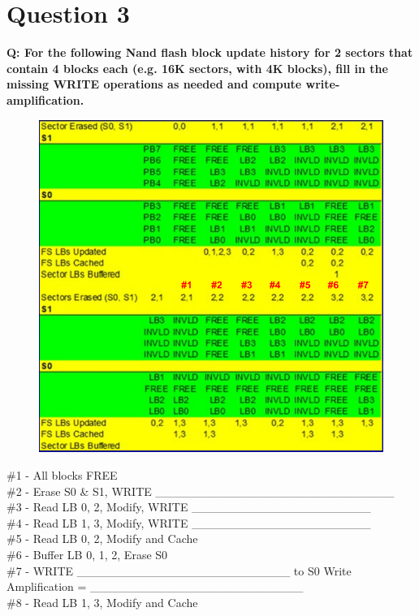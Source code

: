 \documentclass[a4paper,11pt]{article}%
\newenvironment{qanda}{\setlength{\parindent}{0pt}}{\bigskip}
\newcommand{\Q}{\bigskip\bfseries Q: }
\begin{document}
\begin{qanda}
	\section{Question 3}
	\Q  For the following Nand flash block update history for 2 sectors that contain 4 blocks each (e.g. 16K
	sectors, with 4K blocks), fill in the missing WRITE operations as needed and compute write-
	amplification.\\
	\begin{figure}[H]
		\centering
		\includegraphics[scale=0.6]{figures/q3.png}
	\end{figure}
	\#1 - All blocks FREE\\
	\#2 - Erase S0 \& S1, WRITE \_\_\_\_\_\_\_\_\_\_\_\_\_\_\_\_\_\_\_\_\_\_\_\_\_\_\_\_\\
	\#3 - Read LB 0, 2, Modify, WRITE \_\_\_\_\_\_\_\_\_\_\_\_\_\_\_\_\_\_\_\_\_\\
	\#4 - Read LB 1, 3, Modify, WRITE \_\_\_\_\_\_\_\_\_\_\_\_\_\_\_\_\_\_\_\_\_\\
	\#5 - Read LB 0, 2, Modify and Cache\\
	\#6 - Buffer LB 0, 1, 2, Erase S0\\
	\#7 - WRITE \_\_\_\_\_\_\_\_\_\_\_\_\_\_\_\_\_\_\_\_\_\_\_\_\_ to S0
	Write Amplification = \_\_\_\_\_\_\_\_\_\_\_\_\_\_\_\_\_\_\_\_\_\_\_\_\_\\
	\#8 - Read LB 1, 3, Modify and Cache\\

\end{qanda}
\end{document}
